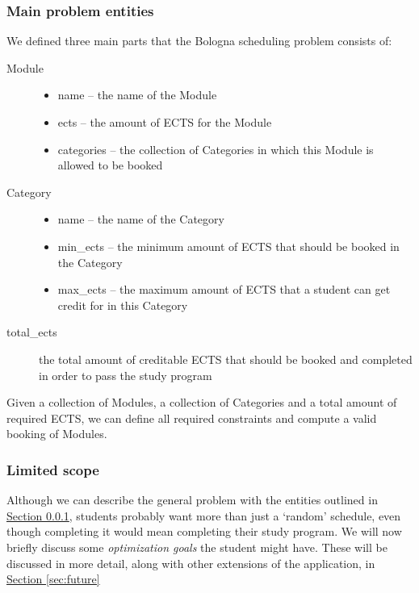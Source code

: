\documentclass[a4paper]{article}
\begin{document}
\subsubsection{Main problem entities}
\label{sec:problem-parts}
We defined three main parts that the Bologna scheduling problem consists of:
\begin{description}
	\item[Module] \hspace*{1em}
	\begin{itemize}
		\item name -- the name of the Module
		\item ects -- the amount of ECTS for the Module
		\item categories -- the collection of Categories in which this Module is allowed to be booked
	\end{itemize}

	\item[Category] \hspace*{1em}
	\begin{itemize}
		\item name -- the name of the Category
		\item min\_ects -- the minimum amount of ECTS that should be booked in the Category
		\item max\_ects -- the maximum amount of ECTS that a student can get credit for in this Category
	\end{itemize}

	\item[total\_ects] the total amount of creditable ECTS that should be booked and completed in order to pass the study program
\end{description}
Given a collection of Modules, a collection of Categories and a total amount of required ECTS, we can define all required constraints and compute a valid booking of Modules.


\subsubsection{Limited scope}
\label{sec:problem-scope}
Although we can describe the general problem with the entities outlined in 
\hyperref[sec:problem-parts]{Section \ref*{sec:problem-parts}}, 
students probably want more than just a `random' schedule, even though completing it would mean completing their study program.
We will now briefly discuss some \emph{optimization goals} the student might have. 
These will be discussed in more detail, along with other extensions of the application, in 
\hyperref[sec:future]{Section \ref*{sec:future}}
\end{document}

